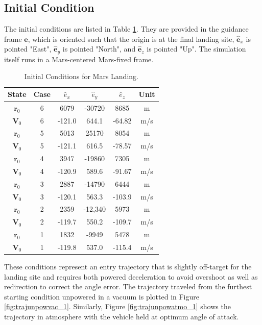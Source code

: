 \subsection{Initial Condition}
The initial conditions are listed in Table \ref{tab:IC}. They are provided in the guidance frame $\hat{\bm{e}}$, which is oriented such that the origin is at the final landing site, $\hat{\bm{e}}_x$ is pointed "East", $\hat{\bm{e}}_y$ is pointed "North", and $\hat{\bm{e}}_z$ is pointed "Up". The simulation itself runs in a Mars-centered Mars-fixed frame. 

\begin{table}[hbt]
	\centering
	\begin{minipage}{3.5in}
		\centering
		\caption{Initial Conditions for Mars Landing\label{tab:IC}.}
		\begin{tabular}{|c||c|c|c|c|c||}    \hline
			State &	Case & $\hat{e}_x$  &  $\hat{e}_y$ & $\hat{e}_z$ & Unit \\ \hline \hline
			$\bm{r}_0$ & 6 & 6079  & -30720 & 8685 & m \\ \hline
			$\bm{V}_0$ & 6 & -121.0  & 644.1 & -64.82 & m/s \\ \hline
			$\bm{r}_0$ & 5 & 5013  & 25170 & 8054 & m \\ \hline
			$\bm{V}_0$ & 5 & -121.1  & 616.5 & -78.57 & m/s \\ \hline
			$\bm{r}_0$ & 4 & 3947  & -19860 & 7305 & m\\ \hline
			$\bm{V}_0$ & 4 & -120.9  & 589.6 & -91.67 & m/s \\ \hline
			$\bm{r}_0$ & 3 & 2887  & -14790 & 6444 & m \\ \hline
			$\bm{V}_0$ & 3 & -120.1  & 563.3 & -103.9 & m/s \\ \hline
			$\bm{r}_0$ & 2 & 2359  & -12,340 & 5973 & m \\ \hline
			$\bm{V}_0$ & 2 & -119.7  & 550.2 & -109.7 & m/s \\ \hline
			$\bm{r}_0$ & 1 & 1832 & -9949 & 5478 & m \\ \hline
			$\bm{V}_0$ & 1 & -119.8 & 537.0 & -115.4 & m/s \\ \hline
		\end{tabular}
	\end{minipage}
\end{table}

These conditions represent an entry trajectory that is slightly off-target for the landing site and requires both powered deceleration to avoid overshoot as well as redirection to correct the angle error. The trajectory traveled from the furthest starting condition unpowered in a vacuum is plotted in Figure \ref{fig:trajunpowvac_1}. Similarly, Figure \ref{fig:trajunpowatmo_1} shows the trajectory in atmosphere with the vehicle held at optimum angle of attack.

